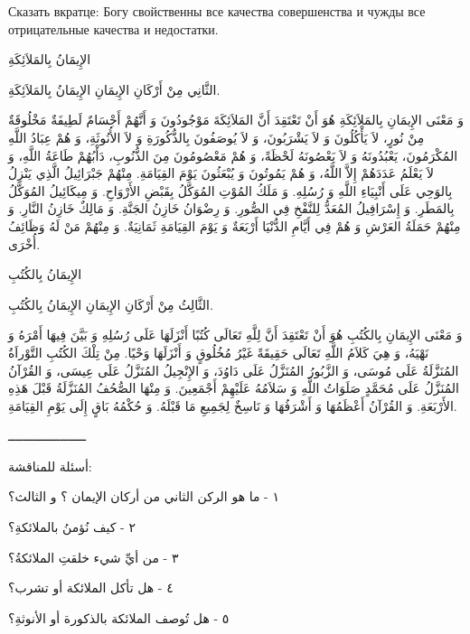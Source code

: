 \documentclass[a5paper]{article}
\begin{document}
Сказать вкратце: Богу свойственны все качества совершенства и чужды все отрицательные качества и недостатки.

الإِيمَانُ بِالمَلاَئِكَةِ

الثَّانِي مِنْ أَرْكَانِ الإِيمَانِ الإِيمَانُ بِالمَلاَئِكَةِ.

وَ مَعْنَى الإِيمَانِ بِالمَلاَئِكَةِ هُوَ أَنْ تَعْتَقِدَ أَنَّ المَلاَئِكَةَ مَوْجُودُونَ وَ أَنَّهُمْ أَجْسَامٌ لَطِيفَةٌ مَخْلُوقَةٌ مِنْ نُورٍ، لاَ يَأْكُلُونَ وَ لاَ يَشْرَبُونَ، وَ لاَ يُوصَفُونَ بِالذُّكُورَةِ وَ لاَ الأُنُوثَةِ، وَ هُمْ عِبَادُ اللَّهِ المُكْرَمُونَ، يَعْبُدُونَهُ وَ لاَ يَعْصُونَهُ لَحْظَةً، وَ هُمْ مَعْصُومُونَ مِنَ الذُّنُوبِ، دَأْبُهُمْ طَاعَةُ اللَّهِ، وَ لاَ يَعْلَمُ عَدَدَهُمْ إِلاَّ اللَّهُ، وَ هُمْ يَمُوتُونَ وَ يُبْعَثُونَ يَوْمَ القِيَامَةِ. مِنْهُمْ جَبْرَائِيلُ الَّذِي يَنْزِلُ بِالوَحِي عَلَى أَنْبِيَاءِ اللَّهِ وَ رُسُلِهِ. وَ مَلَكُ المُوْتِ المُوَكَّلُ بِقَبْضِ الأَرْوَاحِ. وَ مِيكَائِيلُ المُوَكَّلُ بِالمَطَرِ. وَ إِسْرَافِيلُ المُعَدُّ لِلنَّفْخِ فِي الصُّورِ. وَ رِضْوَانُ خَازِنُ الجَنَّةِ. وَ مَالِكٌ خَازِنُ النَّارِ. وَ مِنْهُمْ حَمَلَةُ العَرْشِ وَ هُمْ فِي أَيَّامِ الدُّنْيَا أَرْبَعَةٌ وَ يَوْمَ القِيَامَةِ ثَمَانِيَةٌ. وَ مِنْهُمْ مَنْ لَهُ وَظَائِفُ أُخْرَى. 

الإِيمَانُ بِالكُتُبِ

الثَّالِثُ مِنْ أَرْكَانِ الإِيمَانِ الإِيمَانُ بِالكُتُبِ.

وَ مَعْنَى الإِيمَانِ بِالكُتُبِ هُوَ أَنْ تَعْتَقِدَ أَنَّ لِلَّهِ تَعَالَى كُتُبًا أَنْزَلَهَا عَلَى رُسُلِهِ وَ بَيَّنَ فِيهَا أَمْرَهُ وَ نَهْيَهُ، وَ هِيَ كَلاَمُ اللَّهِ تَعَالَى حَقِيقَةً غَيْرُ مُخُلُوقٍ وَ أَنْزَلَهَا وَحْيًا. مِنْ تِلْكَ الكُتُبِ التَّوْراَةُ المُنَزَّلَةُ عَلَى مُوسَى، وَ الزَّبُورُ المُنَزَّلُ عَلَى دَاوُدَ، وَ الإِنْجِيلُ المُنَزَّلُ عَلَى عِيسَى، وَ القُرْآنُ المُنَزَّلُ عَلَى مُحَمَّدٍ صَلَوَاتُ اللَّهِ وَ سَلاَمُهُ عَلَيْهِمْ أَجْمَعِينَ. وَ مِنْهَا الصُّحُفُ المُنَزَّلَةُ قَبْلَ هَذِهِ الأَرْبَعَةِ. وَ القُرْآنُ أَعْظَمُهَا وَ أَشْرَفُهَا وَ نَاسِخٌ لِجَمِيعِ مَا قَبْلَهُ. وَ حُكْمُهُ بَاقٍ إِلَى يَوْمِ القِيَامَةِ.

ـــــــــــــــــــــ

أسئلة للمناقشة:

١ - ما هو الركن الثاني من أركان الإيمان ؟ و الثالث؟

٢ - كيف نُؤمنُ بالملائكةِ؟

٣ - من أيِّ شيء خلقتِ الملائكةُ؟

٤ - هل تأكل الملائكة أو تشرب؟

٥ - هل تُوصف الملائكة بالذكورة أو الأنوثةِ؟
\end{document}
